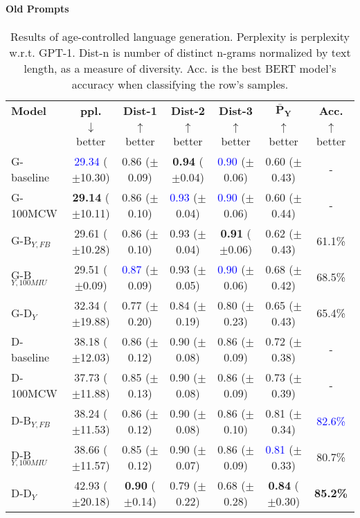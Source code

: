 \paragraph{Old Prompts}

\begin{table*}[h]
    \centering
    \begin{tabular}{l | c c c c | c c}
    \toprule
    \textbf{Model} & \textbf{ppl.} & \textbf{Dist-1} & \textbf{Dist-2} & \textbf{Dist-3} & $\boldsymbol{\bar{P}_Y}$ & \textbf{Acc.}\\
     & $\downarrow$ better & $\uparrow$ better & $\uparrow$ better & $\uparrow$ better & $\uparrow$ better & $\uparrow$ better\\
    \midrule
    \midrule
    G-baseline & \textcolor{blue}{29.34} ($\pm$10.30) & 0.86 ($\pm$0.09) & \textbf{0.94} ($\pm$0.04) & \textcolor{blue}{0.90} ($\pm$0.06) & 0.60 ($\pm$0.43) & -\\
    G-100MCW & \textbf{29.14} ($\pm$10.11) & 0.86 ($\pm$0.10) & \textcolor{blue}{0.93} ($\pm$0.04) & \textcolor{blue}{0.90} ($\pm$0.06) & 0.60 ($\pm$0.44) & -\\
    \midrule
    G-B$_{Y, FB}$ & 29.61 ($\pm$10.28) & 0.86 ($\pm$0.10) & 0.93 ($\pm$0.04) & \textbf{0.91} ($\pm$0.06) & 0.62 ($\pm$0.43) & 61.1\%\\
    G-B$_{Y, 100MIU}$ & 29.51 ($\pm$0.09) & \textcolor{blue}{0.87} ($\pm$0.09) & 0.93 ($\pm$0.05) & \textcolor{blue}{0.90} ($\pm$0.06) & 0.68 ($\pm$0.42) & 68.5\%\\
    \midrule
    G-D$_{Y}$ & 32.34 ($\pm$19.88) & 0.77 ($\pm$0.20) & 0.84 ($\pm$0.19) & 0.80 ($\pm$0.23) & 0.65 ($\pm$0.43) & 65.4\%\\
    \midrule
    \midrule
    D-baseline & 38.18 ($\pm$12.03) & 0.86 ($\pm$0.12) & 0.90 ($\pm$0.08) & 0.86 ($\pm$0.09) & 0.72 ($\pm$0.38) & -\\
    D-100MCW & 37.73 ($\pm$11.88) & 0.85 ($\pm$0.13) & 0.90 ($\pm$0.08) & 0.86 ($\pm$0.09) & 0.73 ($\pm$0.39) & -\\
    \midrule
    D-B$_{Y, FB}$ & 38.24 ($\pm$11.53) & 0.86 ($\pm$0.12) & 0.90 ($\pm$0.08) & 0.86 ($\pm$0.10) & 0.81 ($\pm$0.34) & \textcolor{blue}{82.6\%}\\
    D-B$_{Y, 100MIU}$ & 38.66 ($\pm$11.57) & 0.85 ($\pm$0.12) & 0.90 ($\pm$0.07) & 0.86 ($\pm$0.09) & \textcolor{blue}{0.81} ($\pm$0.33) & 80.7\%\\
    \midrule
    D-D$_{Y}$ & 42.93 ($\pm$20.18) & \textbf{0.90} ($\pm$0.14) & 0.79 ($\pm$0.22) & 0.68 ($\pm$0.28) & \textbf{0.84} ($\pm$0.30) & \textbf{85.2\%}\\
    \bottomrule
    \end{tabular}
    \caption{ Results of age-controlled language generation. Perplexity is perplexity w.r.t. GPT-1. Dist-n is number of distinct n-grams normalized by text length, as a measure of diversity. Acc. is the best BERT model's accuracy when classifying the row's samples.}
    \label{tab:ctg_results_ws_old_prompt_young_model}
\end{table*}

